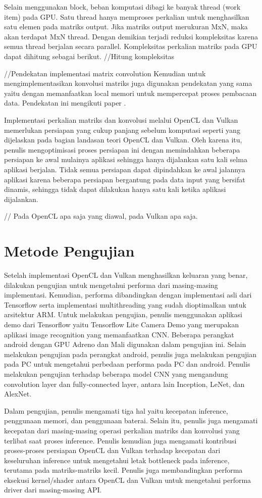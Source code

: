 Selain menggunakan block, beban komputasi dibagi ke banyak thread (work item) pada GPU. Satu thread hanya memproses perkalian untuk menghasilkan satu elemen pada matriks output. Jika matriks output merukuran MxN, maka akan terdapat MxN thread. Dengan demikian terjadi reduksi kompleksitas karena semua thread berjalan secara parallel. Kompleksitas perkalian matriks pada GPU dapat dihitung sebagai berikut.
//Hitung kompleksitas

//Pendekatan implementasi matrix convolution
Kemudian untuk mengimplementasikan konvolusi matriks juga digunakan pendekatan yang sama yaitu dengan memanfaatkan local memori untuk mempercepat proses pembacaan data. Pendekatan ini mengikuti paper \cite{convblock}. 

Implementasi perkalian matriks dan konvolusi melalui OpenCL dan Vulkan memerlukan persiapan yang cukup panjang sebelum komputasi seperti yang dijelaskan pada bagian landasan teori OpenCL dan Vulkan. Oleh karena itu, penulis mengoptimisasi proses persiapan ini dengan memindahkan beberapa persiapan ke awal mulainya aplikasi sehingga hanya dijalankan satu kali selma aplikasi berjalan. Tidak semua persiapan dapat dipindahkan ke awal jalannya aplikasi karena beberapa persiapan bergantung pada data input yang bersifat dinamis, sehingga tidak dapat dilakukan hanya satu kali ketika aplikasi dijalankan. 

// Pada OpenCL apa saja yang diawal, pada Vulkan apa saja.

\section{Metode Pengujian }
Setelah implementasi OpenCL dan Vulkan menghasilkan keluaran yang benar, dilakukan pengujian untuk mengetahui performa dari masing-masing implementasi. Kemudian, performa dibandingkan dengan implementasi asli dari Tensorflow serta implementasi multithreading yang sudah dioptimalkan untuk arsitektur ARM. Untuk melakukan pengujian, penulis menggunakan aplikasi demo dari Tensorflow yaitu Tensorflow Lite Camera Demo yang merupakan aplikasi image recognition yang memanfaatkan CNN. Beberapa perangkat android dengan GPU Adreno dan Mali digunakan dalam pengujian ini. Selain melakukan pengujian pada perangkat android, penulis juga melakukan pengujian pada PC untuk mengetahui perbedaan performa pada PC dan android. Penulis melakukan pengujian terhadap beberapa model CNN yang mengandung convolution layer dan fully-connected layer, antara lain Inception, LeNet, dan AlexNet. 

Dalam pengujian, penulis mengamati tiga hal yaitu kecepatan inference, penggunaan memori, dan penggunaan baterai. Selain itu, penulis juga mengamati kecepatan dari masing-masing operasi perkalian matriks dan konvolusi yang terlibat saat proses inference. Penulis kemudian juga mengamati kontribusi proses-proses persiapan OpenCL dan Vulkan terhadap kecepatan dari keseluruhan inference untuk mengetahui letak bottleneck pada inference, terutama pada matriks-matriks kecil. Penulis juga membandingkan performa eksekusi kernel/shader antara OpenCL dan Vulkan untuk mengetahui performa driver dari masing-masing API.